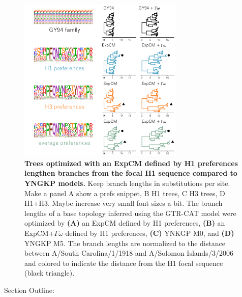 \documentclass[11pt]{article}
\newcommand\skhcomment[1]{{\color{cyan}#1}}
\newcommand\jdbcomment[1]{{\color{red}#1}}
\begin{document}
\begin{figure}[H]
\centerline{\includegraphics[width=0.70\textwidth]{figures/empirical_trees_2}}
\caption{\label{fig:empirical_trees2}
\textbf{Trees optimized with an ExpCM defined by H1 preferences lengthen branches from the focal H1 sequence compared to YNGKP models.} 
\jdbcomment{Keep branch lengths in substitutions per site. Make a panel A show a prefs snippet, B H1 trees, C H3 trees, D H1+H3. Maybe increase very small font sizes a bit.}
The branch lengths of a base topology inferred using the GTR-CAT model were optimized by \textbf{(A)} an ExpCM defined by H1 preferences, \textbf{(B)} an ExpCM+$\Gamma\omega$ defined by H1 preferences, \textbf{(C)} YNKGP M0, and \textbf{(D)} YNGKP M5.
The branch lengths are normalized to the distance between A/South Carolina/1/1918 and A/Solomon Islands/3/2006 and colored to indicate the distance from the H1 focal sequence (black triangle).
}
\end{figure}

\skhcomment{Section Outline:}
\end{document}
